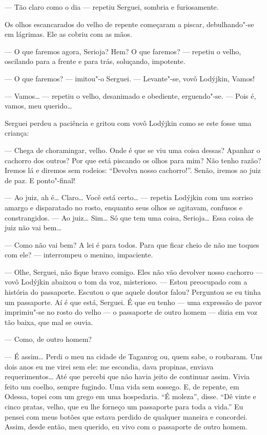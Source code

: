 --- Tão claro como o dia --- repetiu Serguei, sombria e furiosamente.

Os olhos escancarados do velho de repente começaram a piscar,
debulhando"-se em lágrimas. Ele as cobriu com as mãos.

--- O que faremos agora, Serioja? Hem? O que faremos? --- repetiu o
velho, oscilando para a frente e para trás, soluçando, impotente.

--- O que faremos? --- imitou"-o Serguei. --- Levante"-se, vovô Lodýjkin,
Vamos!

--- Vamos\ldots{} --- repetiu o velho, desanimado e obediente, erguendo"-se.
--- Pois é, vamos, meu querido\ldots{}

Serguei perdeu a paciência e gritou com vovô Lodýjkin como se este fosse
uma criança:

--- Chega de choramingar, velho. Onde é que se viu uma coisa dessas?
Apanhar o cachorro dos outros? Por que está piscando os olhos para mim?
Não tenho razão? Iremos lá e diremos sem rodeios: ``Devolva nosso
cachorro!''. Senão, iremos ao juiz de paz. E ponto"-final!

--- Ao juiz, ah é\ldots{} Claro\ldots{} Você está certo\ldots{} --- repetia Lodýjkin
com um sorriso amargo e disparatado no rosto, enquanto seus olhos se
agitavam, confusos e constrangidos. --- Ao juiz\ldots{} Sim\ldots{} Só que tem uma
coisa, Serioja\ldots{} Essa coisa de juiz não vai bem\ldots{}

--- Como não vai bem? A lei é para todos. Para que ficar cheio de não me
toques com ele? --- interrompeu o menino, impaciente.

--- Olhe, Serguei, não fique bravo comigo. Eles não vão devolver nosso
cachorro --- vovô Lodýjkin abaixou o tom da voz, misterioso. --- Estou
preocupado com a história do passaporte. Escutou o que aquele doutor
falou? Perguntou se eu tinha um passaporte. Aí é que está, Serguei. É
que eu tenho --- uma expressão de pavor imprimiu"-se no rosto do velho
--- o passaporte de outro homem --- dizia em voz tão baixa, que mal se
ouvia.

--- Como, de outro homem?

--- É assim\ldots{} Perdi o meu na cidade de Taganrog ou, quem sabe, o
roubaram. Uns dois anos eu me virei sem ele: me escondia, dava propinas,
enviava requerimentos\ldots{} Até que percebi que não havia jeito de
continuar assim. Vivia feito um coelho, sempre fugindo. Uma vida sem
sossego. E, de repente, em Odessa, topei com um grego em uma hospedaria.
``É moleza'', disse. ``Dê vinte e cinco pratas, velho, que eu lhe forneço
um passaporte para toda a vida.'' Eu pensei com meus botões que estava
perdido de qualquer maneira e concordei. Assim, desde então, meu
querido, eu vivo com o passaporte de outro homem.

